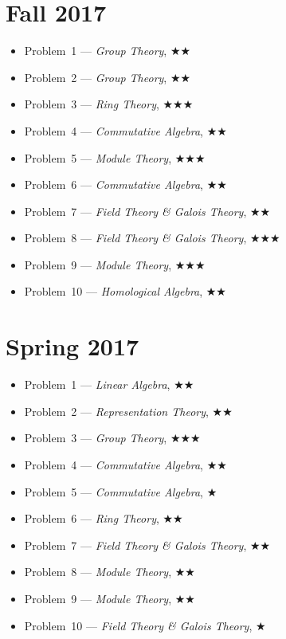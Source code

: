 \documentclass[11pt,letterpaper]{book}
\begin{document}
\section*{Fall 2017}
\begin{itemize}
\item Problem~1 --- \textit{Group Theory}, $\bigstar\bigstar$
\item Problem~2 --- \textit{Group Theory}, $\bigstar\bigstar$
\item Problem~3 --- \textit{Ring Theory}, $\bigstar\bigstar\bigstar$
\item Problem~4 --- \textit{Commutative Algebra}, $\bigstar\bigstar$
\item Problem~5 --- \textit{Module Theory}, $\bigstar\bigstar\bigstar$
\item Problem~6 --- \textit{Commutative Algebra}, $\bigstar\bigstar$
\item Problem~7 --- \textit{Field Theory \& Galois Theory}, $\bigstar\bigstar$
\item Problem~8 --- \textit{Field Theory \& Galois Theory}, $\bigstar\bigstar\bigstar$
\item Problem~9 --- \textit{Module Theory}, $\bigstar\bigstar\bigstar$
\item Problem~10 --- \textit{Homological Algebra}, $\bigstar\bigstar$
\end{itemize}

\section*{Spring 2017}
\begin{itemize}
\item Problem~1 --- \textit{Linear Algebra}, $\bigstar\bigstar$
\item Problem~2 --- \textit{Representation Theory}, $\bigstar\bigstar$
\item Problem~3 --- \textit{Group Theory}, $\bigstar\bigstar\bigstar$
\item Problem~4 --- \textit{Commutative Algebra}, $\bigstar\bigstar$
\item Problem~5 --- \textit{Commutative Algebra}, $\bigstar$
\item Problem~6 --- \textit{Ring Theory}, $\bigstar\bigstar$
\item Problem~7 --- \textit{Field Theory \& Galois Theory}, $\bigstar\bigstar$
\item Problem~8 --- \textit{Module Theory}, $\bigstar\bigstar$
\item Problem~9 --- \textit{Module Theory}, $\bigstar\bigstar$
\item Problem~10 --- \textit{Field Theory \& Galois Theory}, $\bigstar$
\end{itemize}
\end{document}
